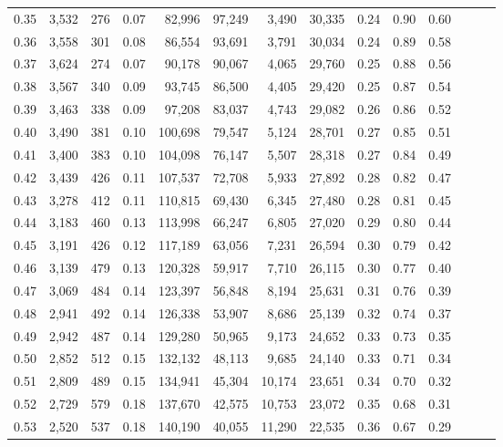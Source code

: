 \begin{tabular}{rrrrrrrrrrrrrr}
0.35 &  3,532 &  276 &  0.07 &   82,996 &   97,249 &   3,490 &  30,335 &  0.24 &  0.90 &      0.60 \\
0.36 &  3,558 &  301 &  0.08 &   86,554 &   93,691 &   3,791 &  30,034 &  0.24 &  0.89 &      0.58 \\
0.37 &  3,624 &  274 &  0.07 &   90,178 &   90,067 &   4,065 &  29,760 &  0.25 &  0.88 &      0.56 \\
0.38 &  3,567 &  340 &  0.09 &   93,745 &   86,500 &   4,405 &  29,420 &  0.25 &  0.87 &      0.54 \\
0.39 &  3,463 &  338 &  0.09 &   97,208 &   83,037 &   4,743 &  29,082 &  0.26 &  0.86 &      0.52 \\
0.40 &  3,490 &  381 &  0.10 &  100,698 &   79,547 &   5,124 &  28,701 &  0.27 &  0.85 &      0.51 \\
0.41 &  3,400 &  383 &  0.10 &  104,098 &   76,147 &   5,507 &  28,318 &  0.27 &  0.84 &      0.49 \\
0.42 &  3,439 &  426 &  0.11 &  107,537 &   72,708 &   5,933 &  27,892 &  0.28 &  0.82 &      0.47 \\
0.43 &  3,278 &  412 &  0.11 &  110,815 &   69,430 &   6,345 &  27,480 &  0.28 &  0.81 &      0.45 \\
0.44 &  3,183 &  460 &  0.13 &  113,998 &   66,247 &   6,805 &  27,020 &  0.29 &  0.80 &      0.44 \\
0.45 &  3,191 &  426 &  0.12 &  117,189 &   63,056 &   7,231 &  26,594 &  0.30 &  0.79 &      0.42 \\
0.46 &  3,139 &  479 &  0.13 &  120,328 &   59,917 &   7,710 &  26,115 &  0.30 &  0.77 &      0.40 \\
0.47 &  3,069 &  484 &  0.14 &  123,397 &   56,848 &   8,194 &  25,631 &  0.31 &  0.76 &      0.39 \\
0.48 &  2,941 &  492 &  0.14 &  126,338 &   53,907 &   8,686 &  25,139 &  0.32 &  0.74 &      0.37 \\
0.49 &  2,942 &  487 &  0.14 &  129,280 &   50,965 &   9,173 &  24,652 &  0.33 &  0.73 &      0.35 \\
0.50 &  2,852 &  512 &  0.15 &  132,132 &   48,113 &   9,685 &  24,140 &  0.33 &  0.71 &      0.34 \\
0.51 &  2,809 &  489 &  0.15 &  134,941 &   45,304 &  10,174 &  23,651 &  0.34 &  0.70 &      0.32 \\
0.52 &  2,729 &  579 &  0.18 &  137,670 &   42,575 &  10,753 &  23,072 &  0.35 &  0.68 &      0.31 \\
0.53 &  2,520 &  537 &  0.18 &  140,190 &   40,055 &  11,290 &  22,535 &  0.36 &  0.67 &      0.29 \\

\end{tabular}

